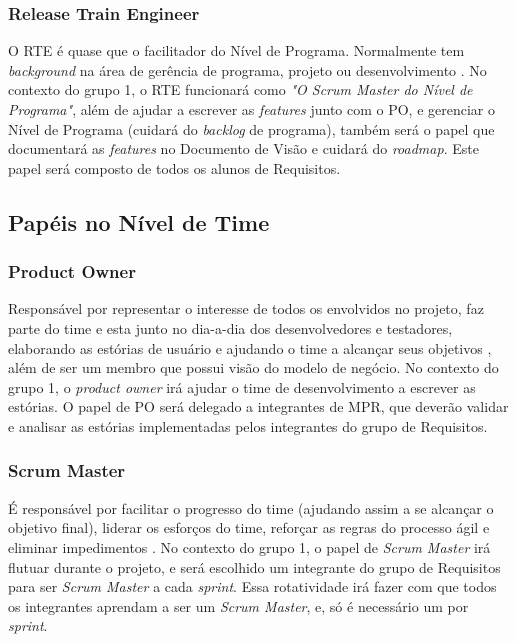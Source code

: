 \subsubsection{Release Train Engineer}
O RTE é quase que o facilitador do Nível de Programa. Normalmente tem \emph{background} na área de gerência de programa, projeto ou desenvolvimento \cite{safesite005}. No contexto do grupo 1, o RTE funcionará como \emph{"O Scrum Master do Nível de Programa"}, além de ajudar a escrever as \emph{features} junto com o PO, e gerenciar o Nível de Programa (cuidará do \emph{backlog} de programa), também será o papel que documentará as \emph{features} no Documento de Visão e cuidará do \emph{roadmap}. Este papel será composto de todos os alunos de Requisitos.


\subsection{Papéis no Nível de Time}

\subsubsection{Product Owner}
Responsável por representar o interesse de todos os envolvidos no projeto, faz parte do time e esta junto no dia-a-dia dos desenvolvedores e testadores, elaborando as estórias de usuário e ajudando o time a alcançar seus objetivos \cite[p. 47-48]{safe001}, além de ser um membro que possui visão do modelo de negócio. No contexto do grupo 1, o \emph{product owner} irá ajudar o time de desenvolvimento a escrever as estórias. O papel de PO será delegado a integrantes de MPR, que deverão validar e analisar as estórias implementadas pelos integrantes do grupo de Requisitos.

\subsubsection{Scrum Master}
É responsável por facilitar o progresso do time (ajudando assim a se alcançar o objetivo final), liderar os esforços do time, reforçar as regras do processo ágil e eliminar impedimentos \cite[p. 47-48]{safe001}. No contexto do grupo 1, o papel de \emph{Scrum Master} irá flutuar durante o projeto, e será escolhido um integrante do grupo de Requisitos para ser \emph{Scrum Master} a cada \emph{sprint}. Essa rotatividade irá fazer com que todos os integrantes aprendam a ser um \emph{Scrum Master}, e, só é necessário um por \emph{sprint}.

